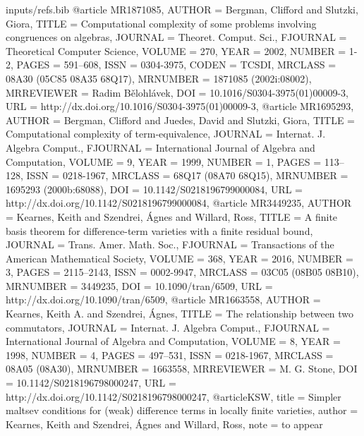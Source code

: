\begin{filecontents*}{inputs/refs.bib}
@article {MR1871085,
    AUTHOR = {Bergman, Clifford and Slutzki, Giora},
     TITLE = {Computational complexity of some problems involving
              congruences on algebras},
   JOURNAL = {Theoret. Comput. Sci.},
  FJOURNAL = {Theoretical Computer Science},
    VOLUME = {270},
      YEAR = {2002},
    NUMBER = {1-2},
     PAGES = {591--608},
      ISSN = {0304-3975},
     CODEN = {TCSDI},
   MRCLASS = {08A30 (05C85 08A35 68Q17)},
  MRNUMBER = {1871085 (2002i:08002)},
MRREVIEWER = {Radim B{\v{e}}lohl{\'a}vek},
       DOI = {10.1016/S0304-3975(01)00009-3},
       URL = {http://dx.doi.org/10.1016/S0304-3975(01)00009-3},
}
@article {MR1695293,
    AUTHOR = {Bergman, Clifford and Juedes, David and Slutzki, Giora},
     TITLE = {Computational complexity of term-equivalence},
   JOURNAL = {Internat. J. Algebra Comput.},
  FJOURNAL = {International Journal of Algebra and Computation},
    VOLUME = {9},
      YEAR = {1999},
    NUMBER = {1},
     PAGES = {113--128},
      ISSN = {0218-1967},
   MRCLASS = {68Q17 (08A70 68Q15)},
  MRNUMBER = {1695293 (2000b:68088)},
       DOI = {10.1142/S0218196799000084},
       URL = {http://dx.doi.org/10.1142/S0218196799000084},
}
@article {MR3449235,
    AUTHOR = {Kearnes, Keith and Szendrei, {\'A}gnes and Willard, Ross},
     TITLE = {A finite basis theorem for difference-term varieties with a
              finite residual bound},
   JOURNAL = {Trans. Amer. Math. Soc.},
  FJOURNAL = {Transactions of the American Mathematical Society},
    VOLUME = {368},
      YEAR = {2016},
    NUMBER = {3},
     PAGES = {2115--2143},
      ISSN = {0002-9947},
   MRCLASS = {03C05 (08B05 08B10)},
  MRNUMBER = {3449235},
       DOI = {10.1090/tran/6509},
       URL = {http://dx.doi.org/10.1090/tran/6509},
}
@article {MR1663558,
    AUTHOR = {Kearnes, Keith A. and Szendrei, {\'A}gnes},
     TITLE = {The relationship between two commutators},
   JOURNAL = {Internat. J. Algebra Comput.},
  FJOURNAL = {International Journal of Algebra and Computation},
    VOLUME = {8},
      YEAR = {1998},
    NUMBER = {4},
     PAGES = {497--531},
      ISSN = {0218-1967},
   MRCLASS = {08A05 (08A30)},
  MRNUMBER = {1663558},
MRREVIEWER = {M. G. Stone},
       DOI = {10.1142/S0218196798000247},
       URL = {http://dx.doi.org/10.1142/S0218196798000247},
}
@article{KSW,
title = {Simpler maltsev conditions for (weak) difference terms in locally finite varieties},
author = {Kearnes, Keith and Szendrei, \'{A}gnes and Willard, Ross},
note = {to appear}
}


\end{filecontents*}
